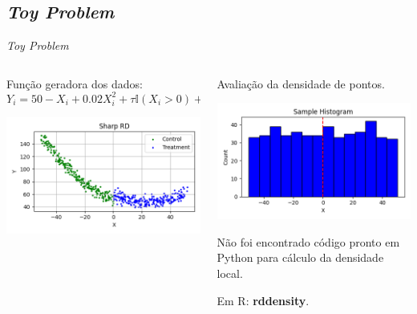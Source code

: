 \documentclass[aspectratio=1610, 10pt]{beamer}
\begin{document}
\subsection{\emph{Toy Problem}}
\begin{frame}{\emph{Toy Problem}}
    \begin{columns}[T] %
		\begin{column}{0.48\linewidth} %
            Função geradora dos dados:
            \begin{equation*}
                Y_i = 50 - X_i + 0.02 X_i^2 + \tau \mathbb{I}(X_i > 0) + \mathcal{N}(0,5)
            \end{equation*}

            \includegraphics[width=\linewidth]{toy/SharpRD.png}
		\end{column}
		\begin{column}{0.48\linewidth}
            Avaliação da densidade de pontos.

            \includegraphics[width=\linewidth]{toy/SampleHistogram.png}

            Não foi encontrado código pronto em Python para cálculo da densidade local.

            Em R: \textbf{rddensity}.
        \end{column}
	\end{columns}
\end{frame}
\end{document}
